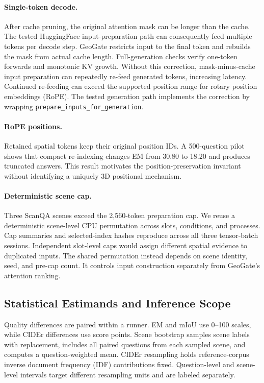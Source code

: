 \paragraph{Single-token decode.} After cache pruning, the original attention mask can be longer than the cache. The tested HuggingFace input-preparation path can consequently feed multiple tokens per decode step. GeoGate restricts input to the final token and rebuilds the mask from actual cache length. Full-generation checks verify one-token forwards and monotonic KV growth. Without this correction, mask-minus-cache input preparation can repeatedly re-feed generated tokens, increasing latency. Continued re-feeding can exceed the supported position range for rotary position embeddings (RoPE). The tested generation path implements the correction by wrapping \texttt{prepare\_inputs\_for\_generation}.

\paragraph{RoPE positions.} Retained spatial tokens keep their original position IDs. A 500-question pilot shows that compact re-indexing changes EM from 30.80 to 18.20 and produces truncated answers. This result motivates the position-preservation invariant without identifying a uniquely 3D positional mechanism.

\paragraph{Deterministic scene cap.} Three ScanQA scenes exceed the 2,560-token preparation cap. We reuse a deterministic scene-level CPU permutation across slots, conditions, and processes. Cap summaries and selected-index hashes reproduce across all three tensor-batch sessions. Independent slot-level caps would assign different spatial evidence to duplicated inputs. The shared permutation instead depends on scene identity, seed, and pre-cap count. It controls input construction separately from GeoGate's attention ranking.

\subsection{Statistical Estimands and Inference Scope}
\label{sec:supp_statistics}

Quality differences are paired within a runner. EM and mIoU use 0--100 scales, while CIDEr differences use score points. Scene bootstrap samples scene labels with replacement, includes all paired questions from each sampled scene, and computes a question-weighted mean. CIDEr resampling holds reference-corpus inverse document frequency (IDF) contributions fixed. Question-level and scene-level intervals target different resampling units and are labeled separately.

